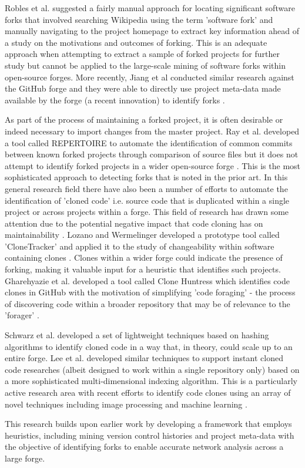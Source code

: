 Robles et al. \citep{robles2006mining} suggested a fairly manual approach for locating significant software forks that involved searching Wikipedia using the term 'software fork' and manually navigating to the project homepage to extract key information ahead of a study on the motivations and outcomes of forking. This is an adequate approach when attempting to extract a sample of forked projects for further study but cannot be applied to the large-scale mining of software forks within open-source forges. More recently, Jiang et al conducted similar research against the GitHub forge and they were able to directly use project meta-data made available by the forge (a recent innovation) to identify forks \citep{jiang2017and}.

As part of the process of maintaining a forked project, it is often desirable or indeed necessary to import changes from the master project. Ray et al. developed a tool called REPERTOIRE to automate the identification of common commits between known forked projects through comparison of source files but it does not attempt to identify forked projects in a wider open-source forge \citep{ray2012repertoire}. This is the most sophisticated approach to detecting forks that is noted in the prior art. In this general research field there have also been a number of efforts to automate the identification of 'cloned code' i.e. source code that is duplicated within a single project or across projects within a forge. This field of research has drawn some attention due to the potential negative impact that code cloning has on maintainability \citep{lozano2007evaluating}. Lozano and Wermelinger developed a prototype tool called 'CloneTracker' and applied it to the study of changeability within software containing clones \citep{lozano2008assessing}. Clones within a wider forge could indicate the presence of forking, making it valuable input for a heuristic that identifies such projects. Gharehyazie et al. developed a tool called Clone Huntress which identifies code clones in GitHub with the motivation of simplifying 'code foraging' - the process of discovering code within a broader repository that may be of relevance to the 'forager' \citep{gharehyazie2018cross}.

Schwarz et al. \citep{schwarz2012often} developed a set of lightweight techniques based on hashing algorithms to identify cloned code in a way that, in theory, could  scale up to an entire forge. Lee et al. \citep{lee2010instant} developed similar techniques to support instant cloned code researches (albeit designed to work within a single repository only) based on a more sophisticated multi-dimensional indexing algorithm. This is a particularly active research area with recent efforts to identify code clones using an array of novel techniques including image processing and machine learning \citep{ghofrani2017conceptual, ragkhitwetsagul2018picture}.

This research builds upon earlier work by developing a framework that employs heuristics, including mining version control histories and project meta-data with the objective of identifying forks to enable accurate network analysis across a large forge.
